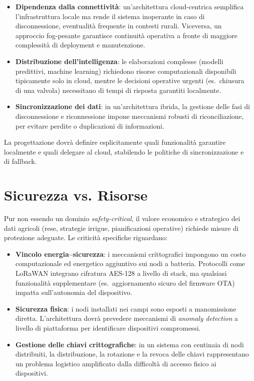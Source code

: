 \begin{itemize}
	\item \textbf{Dipendenza dalla connettività}: un'architettura cloud-centrica semplifica l'infrastruttura locale ma rende il sistema inoperante in caso di disconnessione, eventualità frequente in contesti rurali. Viceversa, un approccio fog-pesante garantisce continuità operativa a fronte di maggiore complessità di deployment e manutenzione.
	
	\item \textbf{Distribuzione dell'intelligenza}: le elaborazioni complesse (modelli predittivi, machine learning) richiedono risorse computazionali disponibili tipicamente solo in cloud, mentre le decisioni operative urgenti (es.\ chiusura di una valvola) necessitano di tempi di risposta garantiti localmente.
	
	\item \textbf{Sincronizzazione dei dati}: in un'architettura ibrida, la gestione delle fasi di disconnessione e riconnessione impone meccanismi robusti di riconciliazione, per evitare perdite o duplicazioni di informazioni.
\end{itemize}

La progettazione dovrà definire esplicitamente quali funzionalità garantire localmente e quali delegare al cloud, stabilendo le politiche di sincronizzazione e di fallback.


\section{Sicurezza vs. Risorse}

Pur non essendo un dominio \textit{safety-critical}, il valore economico e strategico dei dati agricoli (rese, strategie irrigue, pianificazioni operative) richiede misure di protezione adeguate. Le criticità specifiche riguardano:

\begin{itemize}
	\item \textbf{Vincolo energia--sicurezza}: i meccanismi crittografici impongono un costo computazionale ed energetico aggiuntivo sui nodi a batteria. Protocolli come LoRaWAN integrano cifratura AES-128 a livello di stack, ma qualsiasi funzionalità supplementare (es.\ aggiornamento sicuro del firmware OTA) impatta sull'autonomia del dispositivo.
	
	\item \textbf{Sicurezza fisica}: i nodi installati nei campi sono esposti a manomissione diretta. L'architettura dovrà prevedere meccanismi di \textit{anomaly detection} a livello di piattaforma per identificare dispositivi compromessi.
	
	\item \textbf{Gestione delle chiavi crittografiche}: in un sistema con centinaia di nodi distribuiti, la distribuzione, la rotazione e la revoca delle chiavi rappresentano un problema logistico amplificato dalla difficoltà di accesso fisico ai dispositivi.
\end{itemize}


